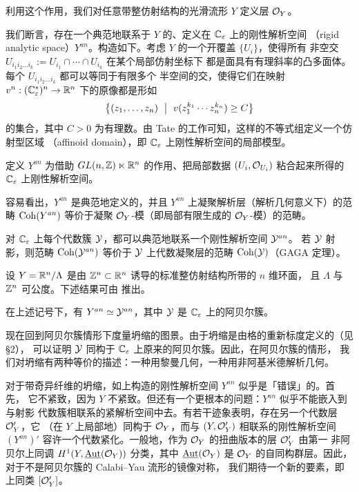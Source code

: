 利用这个作用，我们对任意带整仿射结构的光滑流形 $Y$ 定义层 $\mathcal{O}_Y$。

我们断言，存在一个典范地联系于 $Y$ 的、定义在 $\mathbb{C}_{\varepsilon}$ 上的刚性解析空间
（rigid analytic space）$Y^{an}$。构造如下。考虑 $Y$ 的一个开覆盖 $\{U_i\}$，使得所有
非空交 $U_{i_1i_2\dots i_k}:=U_{i_1}\cap\cdots\cap U_{i_k}$ 在某个局部仿射坐标下
都是面具有有理斜率的凸多面体。每个 $U_{i_1i_2\dots i_k}$ 都可以等同于有限多个
半空间的交，使得它们在映射 $v^n:(\mathbb{C}_{\varepsilon}^*)^n\to\mathbb{R}^n$ 下的原像都是形如
\[
  \bigl\{(z_1,\dots,z_n)\ \bigm|\ v(z_1^{k_1}\cdots z_n^{k_n})\ge C\bigr\}
\]
的集合，其中 $C>0$ 为有理数。由 Tate 的工作可知，这样的不等式组定义一个仿射型区域
（affinoid domain），即 $\mathbb{C}_{\varepsilon}$ 上刚性解析空间的局部模型。

\begin{dfn}
定义 $Y^{an}$ 为借助 $GL(n,\mathbb{Z})\ltimes\mathbb{R}^n$ 的作用、把局部数据 $(U_i,\mathcal{O}_{U_i})$
粘合起来所得的 $\mathbb{C}_{\varepsilon}$ 上刚性解析空间。
\end{dfn}

容易看出，$Y^{an}$ 是典范地定义的，并且 $Y^{an}$ 上凝聚解析层（解析几何意义下）的范畴
$\operatorname{Coh}(Y^{an})$ 等价于凝聚 $\mathcal{O}_Y$-模（即局部有限生成的 $\mathcal{O}_Y$-模）的范畴。

对 $\mathbb{C}_{\varepsilon}$ 上每个代数簇 $\mathcal{Y}$，都可以典范地联系一个刚性解析空间 $\mathcal{Y}^{an}$。
若 $\mathcal{Y}$ 射影，则范畴 $\operatorname{Coh}(\mathcal{Y}^{an})$ 等价于 $\mathcal{Y}$ 上代数凝聚层的范畴
$\operatorname{Coh}(\mathcal{Y})$（GAGA 定理）。

设 $Y=\mathbb{R}^n/\Lambda$ 是由 $\mathbb{Z}^n\subset\mathbb{R}^n$ 诱导的标准整仿射结构所带的 $n$ 维环面，
且 $\Lambda$ 与 $\mathbb{Z}^n$ 可公度。下述结果可由 \cite{Mum} 推出。

\begin{prp}
在上述记号下，有 $Y^{an}\simeq\mathcal{Y}^{an}$，其中 $\mathcal{Y}$ 是 $\mathbb{C}_{\varepsilon}$ 上的阿贝尔簇。
\end{prp}

现在回到阿贝尔簇情形下度量坍缩的图景。由于坍缩是由格的重新标度定义的（见 §2），
可以证明 $\mathcal{Y}$ 同构于 $\mathbb{C}_{\varepsilon}$ 上原来的阿贝尔簇。因此，在阿贝尔簇的情形，
我们对坍缩有两种等价的描述：一种用黎曼几何，一种用非阿基米德解析几何。

\begin{rmk}
对于带奇异纤维的坍缩，如上构造的刚性解析空间 $Y^{an}$ 似乎是「错误」的。首先，
它不紧致，因为 $Y$ 不紧致。但还有一个更根本的问题：$Y^{an}$ 似乎不能嵌入到与射影
代数簇相联系的紧解析空间中去。有若干迹象表明，存在另一个代数层 $\mathcal{O}'_Y$，它
（在 $Y$ 上局部地）同构于 $\mathcal{O}_Y$，而与 $(Y,\mathcal{O}'_Y)$ 相联系的刚性解析空间
$(Y^{an})'$ 容许一个代数紧化。一般地，作为 $\mathcal{O}_Y$ 的扭曲版本的层 $\mathcal{O}'_Y$ 由第一
非阿贝尔上同调 $H^1(Y,\underline{\operatorname{Aut}}(\mathcal{O}_Y))$ 分类，其中 $\underline{\operatorname{Aut}}(\mathcal{O}_Y)$
是 $\mathcal{O}_Y$ 的自同构群层。因此，对于不是阿贝尔簇的 Calabi--Yau 流形的镜像对称，
我们期待一个新的要素，即上同类 $[\mathcal{O}'_Y]$。
\end{rmk}

